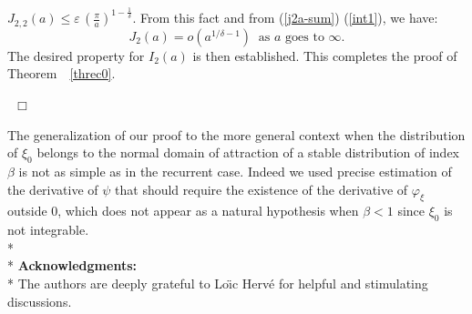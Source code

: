\documentclass[oneside, a4paper,11pt,reqno]{amsart}
\begin{document}
$J_{2,2}(a) \leq \varepsilon\, \left(\frac\pi {a}\right)^{1-\frac 1\delta}$. From this fact and from (\ref{j2a-sum}) (\ref{int1}), we have: 
$$J_2(a) = o(a^{1/\delta-1})\ \mbox{ as }a\mbox{ goes to }
\infty.$$
The desired property for $I_2(a)$ is then established. This completes the proof of Theorem~~\ref{threc0}. 
{\hspace*{\fill}~$\Box$\par\endtrivlist\unskip}
The generalization of our proof to the more general context when the distribution
of $\xi_0$ belongs to the normal domain of attraction of a stable distribution
of index $\beta$ is not as simple as in the recurrent case.
Indeed we used precise estimation of the derivative of $\psi$ that should require
the existence of the derivative of $\varphi_\xi$ outside $0$, which does not appear
as a natural hypothesis when $\beta<1$ since $\xi_0$ is not integrable.\\*
\\*
\noindent
{\bf Acknowledgments:}\\*
The authors are deeply grateful to Lo\"{\i}c Herv\'{e} for helpful and stimulating discussions.
\end{document}
